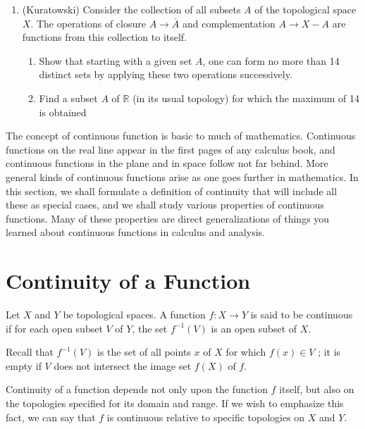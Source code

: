 \begin{enumerate}[itemsep=0.4em, parsep=0pt, topsep=0pt, partopsep=0pt, leftmargin=*, label=\arabic*., ref=\arabic*]
\begin{enumerate}[itemsep=0.2em, parsep=0pt, topsep=0pt, partopsep=0pt, leftmargin=*, label=(\alph*), align=left]
  \end{enumerate}
\item[*21.] (Kuratowski) Consider the collection of all subsets \(A\) of the topological space \(X\). The operations of closure \(A \rightarrow \bar{A}\) and complementation \(A \rightarrow X - A\) are functions from this collection to itself.
  \begin{enumerate}[itemsep=0.2em, parsep=0pt, topsep=0pt, partopsep=0pt, leftmargin=*, label=(\alph*), align=left]
  \item Show that starting with a given set \(A\), one can form no more than 14 distinct sets by applying these two operations successively.
  \item Find a subset \(A\) of \(\mathbb{R}\) (in its usual topology) for which the maximum of 14 is obtained
  \end{enumerate}
\end{enumerate}


The concept of continuous function is basic to much of mathematics. Continuous functions on the real line appear in the first pages of any calculus book, and continuous functions in the plane and in space follow not far behind. More general kinds of continuous functions arise as one goes further in mathematics. In this section, we shall formulate a definition of continuity that will include all these as special cases, and we shall study various properties of continuous functions. Many of these properties are direct generalizations of things you learned about continuous functions in calculus and analysis.

\section*{Continuity of a Function}

Let \(X\) and \(Y\) be topological spaces. A function \(f : X \rightarrow Y\) is said to be continuous if for each open subset \(V\) of \(Y\), the set \(f^{-1}( V)\) is an open subset of \(X\).

Recall that \(f^{-1}( V)\) is the set of all points \(x\) of \(X\) for which \(f(x) \in V\) ; it is empty if \(V\) does not intersect the image set \(f( X)\) of \(f\).

Continuity of a function depends not only upon the function \(f\) itself, but also on the topologies specified for its domain and range. If we wish to emphasize this fact, we can say that \(f\) is continuous relative to specific topologies on \(X\) and \(Y\).

